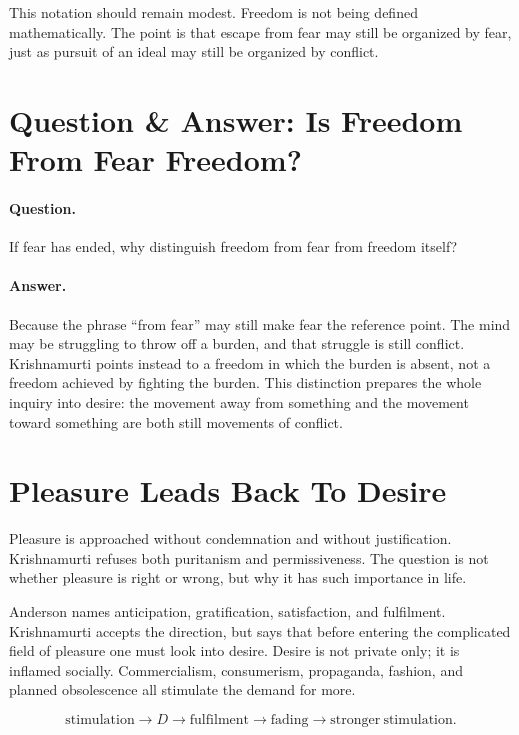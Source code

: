 \documentclass[11pt,oneside]{book}
\begin{document}
This notation should remain modest. Freedom is not being defined mathematically. The point is that escape from fear may still be organized by fear, just as pursuit of an ideal may still be organized by conflict.

\section{Question \& Answer: Is Freedom From Fear Freedom?}

\paragraph{Question.}
If fear has ended, why distinguish freedom from fear from freedom itself?

\paragraph{Answer.}
Because the phrase ``from fear'' may still make fear the reference point. The mind may be struggling to throw off a burden, and that struggle is still conflict. Krishnamurti points instead to a freedom in which the burden is absent, not a freedom achieved by fighting the burden. This distinction prepares the whole inquiry into desire: the movement away from something and the movement toward something are both still movements of conflict.

\section{Pleasure Leads Back To Desire}

Pleasure is approached without condemnation and without justification. Krishnamurti refuses both puritanism and permissiveness. The question is not whether pleasure is right or wrong, but why it has such importance in life.

Anderson names anticipation, gratification, satisfaction, and fulfilment. Krishnamurti accepts the direction, but says that before entering the complicated field of pleasure one must look into desire. Desire is not private only; it is inflamed socially. Commercialism, consumerism, propaganda, fashion, and planned obsolescence all stimulate the demand for more.

\begin{equation}
\mathrm{stimulation}
\longrightarrow D
\longrightarrow \mathrm{fulfilment}
\longrightarrow \mathrm{fading}
\longrightarrow \mathrm{stronger\ stimulation}.
\end{equation}
\end{document}

